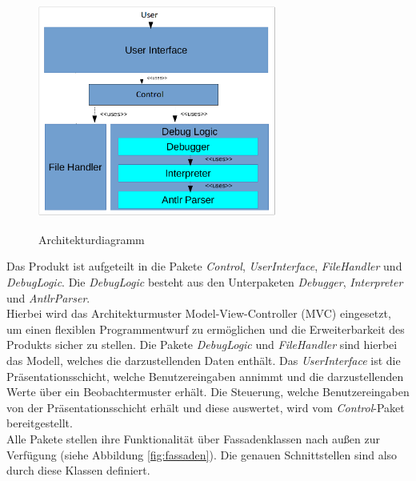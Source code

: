 \documentclass[parskip=full]{scrartcl}
\begin{document}
\begin{figure}[!h]
\centering
\includegraphics[width=0.7\textwidth]{../Plichtenheft/Architektur.png} \\
\caption{Architekturdiagramm}
\end{figure}
Das Produkt ist aufgeteilt in die Pakete \textit{Control}, \textit{UserInterface}, \textit{FileHandler} und \textit{DebugLogic}.
Die \textit{DebugLogic} besteht aus den Unterpaketen \textit{Debugger}, \textit{Interpreter} und
\textit{AntlrParser}.\\
Hierbei wird das Architekturmuster Model-View-Controller (MVC) eingesetzt, um einen flexiblen Programmentwurf zu ermöglichen und die Erweiterbarkeit des Produkts sicher zu stellen. Die Pakete \textit{DebugLogic} und \textit{FileHandler} sind hierbei das Modell, welches die darzustellenden Daten enthält. Das \textit{UserInterface} ist die Präsentationsschicht, welche Benutzereingaben annimmt und die darzustellenden Werte über ein Beobachtermuster erhält. Die Steuerung, welche Benutzereingaben von der Präsentationsschicht erhält und diese auswertet, wird vom \textit{Control}-Paket bereitgestellt. \\
Alle Pakete stellen ihre Funktionalität über Fassadenklassen nach außen zur Verfügung (siehe Abbildung \ref{fig:fassaden}). Die genauen Schnittstellen sind also durch diese Klassen definiert.
\end{document}

